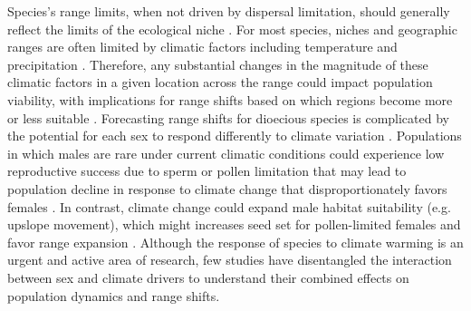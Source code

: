 \documentclass[12pt]{article}
\begin{document}
Species's range limits, when not driven by dispersal limitation, should generally reflect the limits of the ecological niche \citep{lee2016synthesis}. 
For most species, niches and geographic ranges are often limited by climatic factors including temperature and precipitation \citep{sexton2009evolution}. 
Therefore, any substantial changes in the magnitude of these climatic factors in a given location across the range could impact population viability, with implications for range shifts based on which regions become more or less suitable  \citep{davis2001range, pease1989model}. 
Forecasting range shifts for dioecious species is complicated by the potential for each sex to respond differently to climate variation \citep{pottier2021sexual,morrison2016causes}.
Populations in which males are rare under current climatic conditions could experience low reproductive success due to sperm or pollen limitation that may lead to population decline in response to climate change that disproportionately favors females \citep{eberhart2017sex}.
In contrast, climate change could expand male habitat suitability (e.g. upslope movement), which might increases seed set for pollen-limited females and favor range expansion \citep{petry2016sex}.
Although the response of species to climate warming is an urgent and active area of research, few studies have disentangled the interaction between sex and climate drivers to understand their combined effects on population dynamics and range shifts.  
\end{document}

